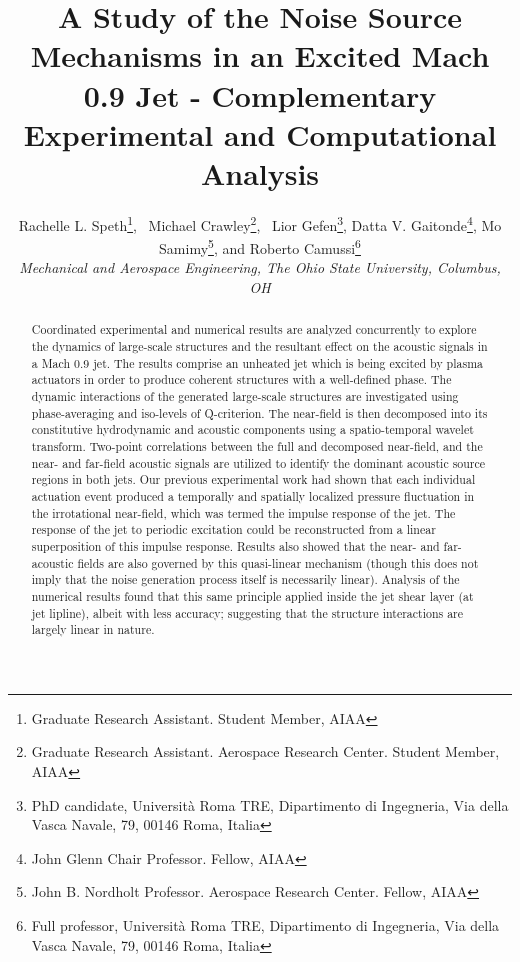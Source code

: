\documentclass[english]{aiaa-tc}
\begin{document}
\title{A Study of the Noise Source Mechanisms in an Excited Mach 0.9 Jet - Complementary Experimental and Computational Analysis}


\author{Rachelle L. Speth\thanks{Graduate Research Assistant. Student Member, AIAA}, \
Michael Crawley\thanks{Graduate Research Assistant. Aerospace Research Center. Student Member, AIAA}, \
Lior Gefen\thanks{PhD candidate, Università Roma TRE, Dipartimento di Ingegneria, Via della Vasca Navale, 79, 00146 Roma, Italia},
 Datta V. Gaitonde\thanks{John Glenn Chair Professor. Fellow, AIAA},
 Mo Samimy\thanks{John B. Nordholt Professor. Aerospace Research Center. Fellow, AIAA}, 
 and Roberto Camussi\thanks{Full professor, Università Roma TRE, Dipartimento di Ingegneria, Via della Vasca Navale, 79, 00146 Roma, Italia}
\\\normalsize\itshape Mechanical and Aerospace Engineering, The Ohio State University, Columbus, OH \\}


\maketitle

\begin{abstract}
Coordinated experimental and numerical results are analyzed concurrently to explore the dynamics of large-scale structures and the resultant effect on the acoustic signals in a Mach 0.9 jet.
The results comprise an unheated jet which is being excited by plasma actuators in order to produce coherent structures with a well-defined phase.
The dynamic interactions of the generated large-scale structures are investigated using phase-averaging and iso-levels of Q-criterion.
The near-field is then decomposed into its constitutive hydrodynamic and acoustic components using a spatio-temporal wavelet transform.
Two-point correlations between the full and decomposed near-field, and the near- and far-field acoustic signals are utilized to identify the dominant acoustic source regions in both jets.
Our previous experimental work had shown that each individual actuation event produced a temporally and spatially localized pressure fluctuation in the irrotational near-field, which was termed the impulse response of the jet. The response of the jet to periodic excitation could be reconstructed from a linear superposition of this impulse response.
Results also showed that the near- and far-acoustic fields are also governed by this quasi-linear mechanism (though this does not imply that the noise generation process itself is necessarily linear).
Analysis of the numerical results found that this same principle applied inside the jet shear layer (at jet lipline), albeit with less accuracy; suggesting that the structure interactions are largely linear in nature.


\end{abstract}
\end{document}
